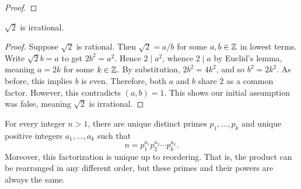 \documentclass[11pt,a4paper]{article}
\begin{document}
\begin{proof}
    
\end{proof}

\begin{prop}
    \(\sqrt{2}\) is irrational.
\end{prop}

\begin{proof}
    Suppose \(\sqrt{2}\) is rational. 
    Then \(\sqrt{2}=a/b\) for some \(a,b\in \mathbb{Z}\) in lowest terms.
    Write \(\sqrt{2} b = a\) to get \(2b^2 = a^2\).
    Hence \(2\mid a^2\),
    whence \(2\mid a\) by Euclid's lemma, meaning  \(a=2k\) for some \(k\in\mathbb{Z}\).
    By substitution, \(2b^2 = 4k^2\), and so \(b^2= 2k^2\).
    As before, this implies  \(b\) is even.
    Therefore,  both \(a\) and \(b\) share \(2\) as a common factor. 
    However, this  contradicts \((a,b) = 1\).
    This shows our initial assumption was false, meaning \(\sqrt{2}\) is irrational.
\end{proof}


\begin{teo}
   For every integer $n>1$, there are unique distinct primes $p_1, \ldots, p_k $ and unique positive integers $a_1, \ldots, a_k $ such that
\[
n=p_1^{a_1} p_2^{a_2} \cdots p_k^{a_k}.
\] 
Moreover, this factorization is unique up to reordering. That is, the product  can be rearranged in any  different order, but these primes and their powers are always the same.
\end{teo}
\end{document}
